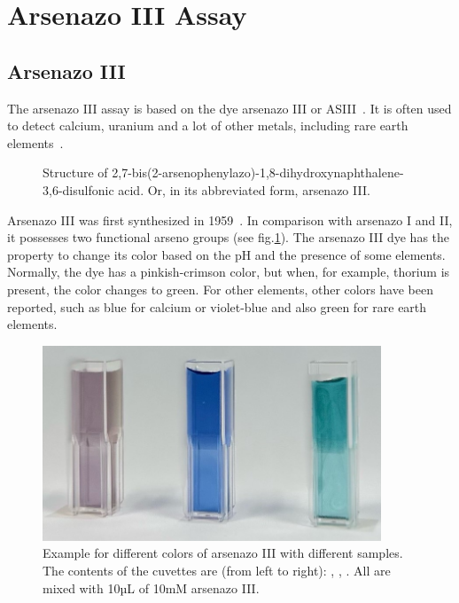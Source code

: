 \newpage


\section{Arsenazo III Assay}

\subsection{Arsenazo III}
The arsenazo III assay is based on the dye arsenazo III or ASIII~\cite{arsenazo3assay}.
It is often used to detect calcium, uranium and a lot of other metals, including rare earth elements~\cite{arsenazo3usage, arsenazo3othermetals}.

\begin{figure}[H]
    \centering
    \caption{Structure of 2,7-bis(2-arsenophenylazo)-1,8-dihydroxynaphthalene-3,6-disulfonic acid. Or, in its abbreviated form, arsenazo III.}
    \label{fig:asiii_structure}
\end{figure}

Arsenazo III was first synthesized in 1959~\cite{arsenazo3fortyyears}.
In comparison with arsenazo I and II, it possesses two functional arseno groups (see fig.\ref{fig:asiii_structure}).
The arsenazo III dye has the property to change its color based on the pH and the presence of some elements.
Normally, the dye has a pinkish-crimson color, but when, for example, thorium is present, the color changes to green.
For other elements, other colors have been reported, such as blue for calcium or violet-blue and also green for rare earth elements.

\begin{figure}[H]
    \centering
    \includegraphics[width=0.9\textwidth]{./media/images/asiii_color_change}
    \caption{Example for different colors of arsenazo III with different samples. The contents of the cuvettes are (from left to right): , , . All are mixed with 10µL of 10mM arsenazo III.}
    \label{fig:asiii_colors}
\end{figure}

